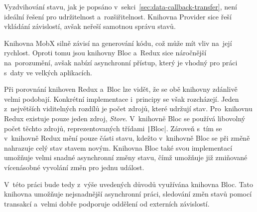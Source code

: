 Vyzdvihování stavu,
jak je popsáno v~sekci~\ref{sec:data-callback-transfer},
není ideální řešení pro udržitelnost a~rozšiřitelnost.
Knihovna Provider sice řeší vkládání závislostí,
avšak neřeší samotnou správu stavů.

Knihovna MobX silně závisí na generování kódu,
což může mít vliv na~její rychlost.
Oproti tomu jsou knihovny Bloc a~Redux sice náročnější na~porozumění,
avšak nabízí asynchronní přístup,
který je vhodný pro práci s~daty ve velkých aplikacích.

Při porovnání knihoven Redux a~Bloc lze vidět,
že se obě knihovny zdánlivě velmi podobají.
Konkrétní implementace i~principy se však rozcházejí.
Jeden z~největších viditelných rozdílů je počet zdrojů,
které udržují stav.
Pro~\mbox{knihovnu} Redux existuje pouze jeden zdroj, \emph{Store}.
V~knihovně Bloc se \mbox{používá} libovolný počet těchto zdrojů,
reprezentovaných třídami \texttt|Bloc|.
\mbox{Zároveň} s~tím se v~knihovně Redux mění pouze části stavu,
kdežto v~knihovně Bloc se při změně nahrazuje celý stav stavem novým.
Knihovna Bloc také svou implementací umožňuje velmi snadné asynchronní
změny stavu,
čímž umožňuje již zmiňované vícenásobné vyvolání změn pro jednu událost.

V~této práci bude tedy z~výše uvedených důvodů využívána knihovna Bloc.
Tato knihovna umožňuje nejsnadnější asynchronní práci,
sledování změn stavů pomocí transakcí
a~velmi dobře podporuje oddělení od externích závislostí.
